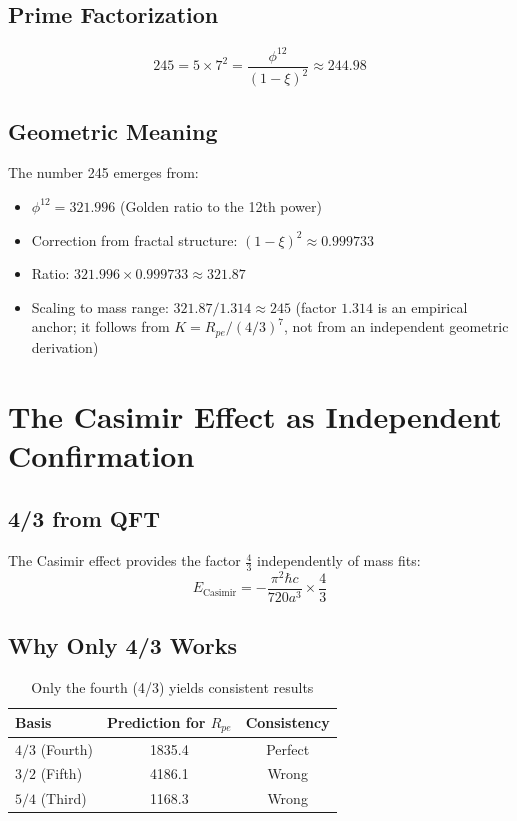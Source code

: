 	\subsection{Prime Factorization}
	\begin{equation}
		245 = 5 \times 7^2 = \frac{\phi^{12}}{(1 - \xi)^2} \approx 244.98
	\end{equation}
	
	\subsection{Geometric Meaning}
	
	The number 245 emerges from:
	\begin{itemize}
		\item $\phi^{12} = 321.996$ (Golden ratio to the 12th power)
		\item Correction from fractal structure: $(1 - \xi)^2 \approx 0.999733$
		\item Ratio: $321.996 \times 0.999733 \approx 321.87$
		\item Scaling to mass range: $321.87/1.314 \approx 245$ (factor $1.314$ is an empirical anchor; it follows from $K = R_{pe}/(4/3)^7$, not from an independent geometric derivation)
	\end{itemize}
	
	\section{The Casimir Effect as Independent Confirmation}
	
	\subsection{4/3 from QFT}
	
	The Casimir effect provides the factor $\frac{4}{3}$ independently of mass fits:
	\begin{equation}
		E_{\text{Casimir}} = -\frac{\pi^2 \hbar c}{720 a^3} \times \frac{4}{3}
	\end{equation}
	
	\subsection{Why Only 4/3 Works}
	
	\begin{table}[htbp]
		\centering
		\begin{tabular}{lcc}
			\toprule
			\textbf{Basis} & \textbf{Prediction for $R_{pe}$} & \textbf{Consistency} \\
			\midrule
			$4/3$ (Fourth) & 1835.4 & \checkmark Perfect \\
			$3/2$ (Fifth) & 4186.1 & \texttimes Wrong \\
			$5/4$ (Third) & 1168.3 & \texttimes Wrong \\
			\bottomrule
		\end{tabular}
		\caption{Only the fourth (4/3) yields consistent results}
	\end{table}
	
